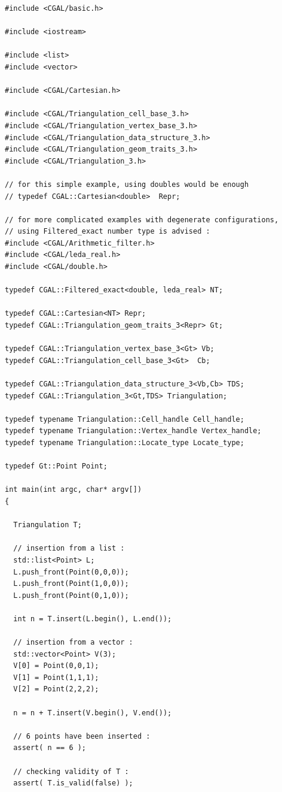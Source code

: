 \begin{verbatim}
#include <CGAL/basic.h>

#include <iostream>

#include <list>
#include <vector>

#include <CGAL/Cartesian.h>

#include <CGAL/Triangulation_cell_base_3.h>
#include <CGAL/Triangulation_vertex_base_3.h>
#include <CGAL/Triangulation_data_structure_3.h>
#include <CGAL/Triangulation_geom_traits_3.h>
#include <CGAL/Triangulation_3.h>

// for this simple example, using doubles would be enough
// typedef CGAL::Cartesian<double>  Repr;

// for more complicated examples with degenerate configurations,
// using Filtered_exact number type is advised :
#include <CGAL/Arithmetic_filter.h>
#include <CGAL/leda_real.h>
#include <CGAL/double.h>

typedef CGAL::Filtered_exact<double, leda_real> NT;

typedef CGAL::Cartesian<NT> Repr;
typedef CGAL::Triangulation_geom_traits_3<Repr> Gt;

typedef CGAL::Triangulation_vertex_base_3<Gt> Vb;
typedef CGAL::Triangulation_cell_base_3<Gt>  Cb;

typedef CGAL::Triangulation_data_structure_3<Vb,Cb> TDS;
typedef CGAL::Triangulation_3<Gt,TDS> Triangulation;

typedef typename Triangulation::Cell_handle Cell_handle;
typedef typename Triangulation::Vertex_handle Vertex_handle;
typedef typename Triangulation::Locate_type Locate_type;

typedef Gt::Point Point;

int main(int argc, char* argv[])
{

  Triangulation T;

  // insertion from a list :
  std::list<Point> L;
  L.push_front(Point(0,0,0));
  L.push_front(Point(1,0,0));
  L.push_front(Point(0,1,0));

  int n = T.insert(L.begin(), L.end());

  // insertion from a vector :
  std::vector<Point> V(3);
  V[0] = Point(0,0,1);
  V[1] = Point(1,1,1);
  V[2] = Point(2,2,2);

  n = n + T.insert(V.begin(), V.end());

  // 6 points have been inserted :
  assert( n == 6 );

  // checking validity of T :
  assert( T.is_valid(false) );


\end{verbatim}
